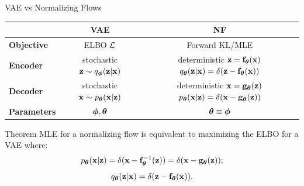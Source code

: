 \documentclass{beamer}
\begin{document}
\begin{frame}{VAE vs Normalizing Flows}
	\begin{table}[]
		\begin{tabular}{l|c|c}
			& \textbf{VAE} & \textbf{NF} \\ \hline
			\textbf{Objective} & ELBO $\mathcal{L}$ & Forward KL/MLE \\ \hline
			\textbf{Encoder} & \shortstack{stochastic \\ $\mathbf{z} \sim q_{\boldsymbol{\phi}}(\mathbf{z}| \mathbf{x})$} &  \shortstack{\\ deterministic \\ $\mathbf{z} = \mathbf{f}_{\boldsymbol{\theta}}(\mathbf{x})$ \\ $q_{\boldsymbol{\theta}}(\mathbf{z}| \mathbf{x}) = \delta(\mathbf{z} - \mathbf{f}_{\boldsymbol{\theta}}(\mathbf{x}))$}  \\ \hline
			\textbf{Decoder} & \shortstack{stochastic \\ $\mathbf{x} \sim p_{\boldsymbol{\theta}}(\mathbf{x}| \mathbf{z})$} & \shortstack{\\ deterministic \\ $\mathbf{x} = \mathbf{g}_{\boldsymbol{\theta}}(\mathbf{z})$ \\ $ p_{\boldsymbol{\theta}}(\mathbf{x} | \mathbf{z}) = \delta(\mathbf{x} - \mathbf{g}_{\boldsymbol{\theta}}(\mathbf{z}))$} \\ \hline
			\textbf{Parameters}  & $\boldsymbol{\phi}, \boldsymbol{\theta}$ & $\boldsymbol{\theta} \equiv \boldsymbol{\phi}$\\ 
		\end{tabular}
	\end{table}
	\vspace{-0.3cm}
	\eqpause
	\begin{block}{Theorem}
		MLE for a normalizing flow is equivalent to maximizing the ELBO for a VAE where:
		\vspace{-0.3cm}
		\[
			p_{\boldsymbol{\theta}}(\mathbf{x} | \mathbf{z}) = \delta (\mathbf{x} - \mathbf{f}^{-1}_{\boldsymbol{\theta}}(\mathbf{z})) = \delta (\mathbf{x} - \mathbf{g}_{\boldsymbol{\theta}}(\mathbf{z}));
		\]
		\vspace{-0.5cm}
		\[
			q_{\boldsymbol{\theta}}(\mathbf{z}| \mathbf{x}) = \delta (\mathbf{z} - \mathbf{f}_{\boldsymbol{\theta}}(\mathbf{x})).
		\]
	\end{block}
\end{frame}
\end{document}
